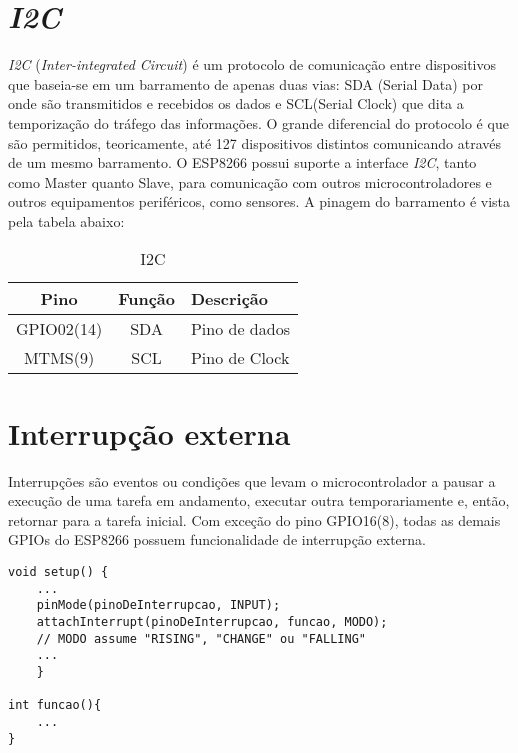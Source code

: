 \documentclass[
	10pt,				%
	openright,			%
	twoside,			%
	a5paper,			%
	english,			%
	french,				%
	spanish,			%
	brazil,				%
	sumario=tradicional
]{abntex2}
\begin{document}
\section{\textit{I2C}}
    \textit{I2C} (\textit{Inter-integrated Circuit}) é um protocolo de comunicação entre dispositivos que baseia-se em um barramento de apenas duas vias: SDA (Serial Data) por onde são transmitidos e recebidos os dados e SCL(Serial Clock) que dita a temporização do tráfego das informações. O grande diferencial do protocolo é que são permitidos, teoricamente, até 127 dispositivos distintos comunicando através de um mesmo barramento.
    O ESP8266 possui suporte a interface \textit{I2C}, tanto como Master quanto Slave, para comunicação com outros microcontroladores e outros equipamentos periféricos, como sensores. A pinagem do barramento é vista pela tabela abaixo:


\begin{table}[ht]
\centering
\begin{tabular}{c c l}
   \toprule
    Pino    & Função & Descrição  \\ [0.5ex]
    \midrule \midrule
    GPIO02(14)      & SDA   & Pino de dados   \\
    MTMS(9)          & SCL   & Pino de Clock            \\[1ex]
    \bottomrule
    \end{tabular}
     \caption{I2C\label{I2C-table}}
\end{table}
               
\section{Interrupção externa}
        Interrupções são eventos ou condições que levam o microcontrolador a pausar a execução de uma tarefa em andamento, executar outra temporariamente e, então, retornar para a tarefa inicial.
        Com exceção do pino GPIO16(8), todas as demais GPIOs do ESP8266 possuem funcionalidade de interrupção externa.
       \begin{lstlisting} 
void setup() {
    ...
    pinMode(pinoDeInterrupcao, INPUT);
    attachInterrupt(pinoDeInterrupcao, funcao, MODO);
    // MODO assume "RISING", "CHANGE" ou "FALLING"
    ...
    }
    
int funcao(){
    ...
}
    
        
        \end{lstlisting}
\end{document}
